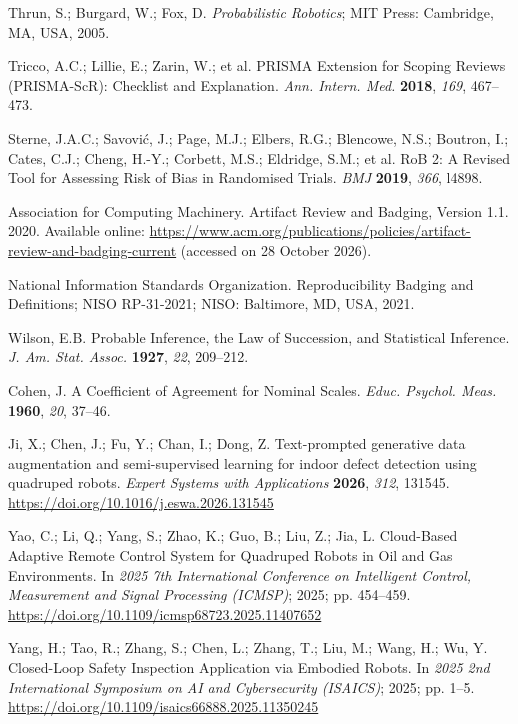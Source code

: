 Thrun, S.; Burgard, W.; Fox, D. {\em Probabilistic Robotics}; MIT Press:
Cambridge, MA, USA, 2005.

Tricco, A.C.; Lillie, E.; Zarin, W.; et al. PRISMA Extension for Scoping
Reviews (PRISMA-ScR): Checklist and Explanation. {\em Ann. Intern. Med.}
{\bf 2018}, {\em 169}, 467--473.

Sterne, J.A.C.; Savovi\'{c}, J.; Page, M.J.; Elbers, R.G.; Blencowe, N.S.;
Boutron, I.; Cates, C.J.; Cheng, H.-Y.; Corbett, M.S.; Eldridge, S.M.; et al.
RoB 2: A Revised Tool for Assessing Risk of Bias in Randomised Trials.
{\em BMJ} {\bf 2019}, {\em 366}, l4898.

Association for Computing Machinery. Artifact Review and Badging, Version 1.1.
2020. Available online:
\url{https://www.acm.org/publications/policies/artifact-review-and-badging-current}
(accessed on 28 October 2026).

National Information Standards Organization. Reproducibility Badging and
Definitions; NISO RP-31-2021; NISO: Baltimore, MD, USA, 2021.

Wilson, E.B. Probable Inference, the Law of Succession, and Statistical
Inference. {\em J. Am. Stat. Assoc.} {\bf 1927}, {\em 22}, 209--212.

Cohen, J. A Coefficient of Agreement for Nominal Scales. {\em Educ. Psychol.
Meas.} {\bf 1960}, {\em 20}, 37--46.

Ji, X.; Chen, J.; Fu, Y.; Chan, I.; Dong, Z. Text-prompted generative data augmentation and semi-supervised learning for indoor defect detection using quadruped robots. \emph{Expert Systems with Applications} \textbf{2026}, \emph{312}, 131545. \url{https://doi.org/10.1016/j.eswa.2026.131545}

Yao, C.; Li, Q.; Yang, S.; Zhao, K.; Guo, B.; Liu, Z.; Jia, L. Cloud-Based Adaptive Remote Control System for Quadruped Robots in Oil and Gas Environments. In \emph{2025 7th International Conference on Intelligent Control, Measurement and Signal Processing (ICMSP)}; 2025; pp. 454--459. \url{https://doi.org/10.1109/icmsp68723.2025.11407652}

Yang, H.; Tao, R.; Zhang, S.; Chen, L.; Zhang, T.; Liu, M.; Wang, H.; Wu, Y. Closed-Loop Safety Inspection Application via Embodied Robots. In \emph{2025 2nd International Symposium on AI and Cybersecurity (ISAICS)}; 2025; pp. 1--5. \url{https://doi.org/10.1109/isaics66888.2025.11350245}

